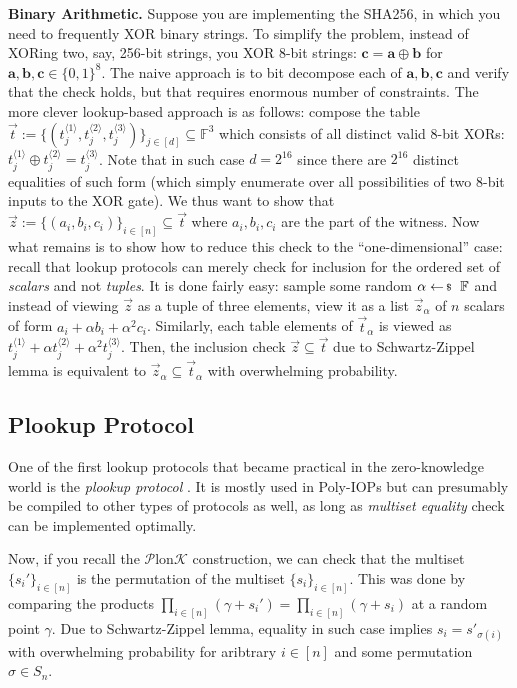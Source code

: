 \documentclass[../../book]{subfiles}
\begin{document}
\textbf{Binary Arithmetic.} Suppose you are implementing the SHA256, in which
you need to frequently XOR binary strings. To simplify the problem, instead of
XORing two, say, 256-bit strings, you XOR 8-bit strings: $\mathbf{c} =
\mathbf{a} \oplus \mathbf{b}$ for $\mathbf{a},\mathbf{b},\mathbf{c} \in
\{0,1\}^8$. The naive approach is to bit decompose each of
$\mathbf{a},\mathbf{b},\mathbf{c}$ and verify that the check holds, but that
requires enormous number of constraints. The more clever lookup-based approach
is as follows: compose the table $\vec{t} := \{(t_j^{\langle 1
\rangle},t_j^{\langle 2 \rangle},t_j^{\langle 3 \rangle})\}_{j \in [d]}
\subseteq \mathbb{F}^3$ which consists of all distinct valid 8-bit XORs:
$t_j^{\langle 1 \rangle} \oplus t_j^{\langle 2 \rangle}=t_j^{\langle 3
\rangle}$. Note that in such case $d=2^{16}$ since there are $2^{16}$ distinct
equalities of such form (which simply enumerate over all possibilities of two
8-bit inputs to the XOR gate). We thus want to show that $\vec{z} :=
\{(a_i,b_i,c_i)\}_{i \in [n]} \subseteq \vec{t}$ where $a_i,b_i,c_i$ are the
part of the witness. Now what remains is to show how to reduce this check to the
``one-dimensional'' case: recall that lookup protocols can merely check for
inclusion for the ordered set of \textit{scalars} and not \textit{tuples}. It is
done fairly easy: sample some random $\alpha \leftarrowS \mathbb{F}$ and instead
of viewing $\vec{z}$ as a tuple of three elements, view it as a list
$\vec{z}_{\alpha}$ of $n$ scalars of form $a_i+\alpha b_i+\alpha^2 c_i$.
Similarly, each table elements of $\vec{t}_{\alpha}$ is viewed as $t_j^{\langle
1 \rangle} + \alpha t_j^{\langle 2 \rangle} + \alpha^2 t_j^{\langle 3 \rangle}$.
Then, the inclusion check $\vec{z} \subseteq \vec{t}$ due to Schwartz-Zippel
lemma is equivalent to $\vec{z}_{\alpha} \subseteq \vec{t}_{\alpha}$ with
overwhelming probability.

\subsection{Plookup Protocol}

One of the first lookup protocols that became practical in the zero-knowledge
world is the \textit{plookup protocol} \cite{plookup}. It is mostly used in Poly-IOPs but can
presumably be compiled to other types of protocols as well, as long as
\textit{multiset equality} check can be implemented optimally.

Now, if you recall the $\mathcal{P}$lon$\mathcal{K}$ construction, we can check
that the multiset $\{s_i'\}_{i \in [n]}$ is the permutation of the multiset
$\{s_i\}_{i \in [n]}$. This was done by comparing the products $\prod_{i \in
[n]}(\gamma+s_i')=\prod_{i \in [n]}(\gamma+s_i)$ at a random point $\gamma$. Due
to Schwartz-Zippel lemma, equality in such case implies $s_{i}=s'_{\sigma(i)}$
with overwhelming probability for aribtrary $i \in [n]$ and some permutation $\sigma
\in S_n$.
\end{document}

